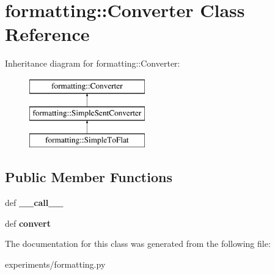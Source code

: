 \hypertarget{classformatting_1_1Converter}{
\section{formatting::Converter Class Reference}
\label{classformatting_1_1Converter}
}
Inheritance diagram for formatting::Converter:\begin{figure}[H]
\begin{center}
\leavevmode
\includegraphics[height=3cm]{classformatting_1_1Converter}
\end{center}
\end{figure}
\subsection*{Public Member Functions}
\begin{DoxyCompactItemize}
\item 
\hypertarget{classformatting_1_1Converter_aa837adfe8b8b6c686cbc7399db8baacb}{
def {\bfseries \_\-\_\-call\_\-\_\-}}
\label{classformatting_1_1Converter_aa837adfe8b8b6c686cbc7399db8baacb}

\item 
\hypertarget{classformatting_1_1Converter_a7dca32288a0528afe44baece7cf74e93}{
def {\bfseries convert}}
\label{classformatting_1_1Converter_a7dca32288a0528afe44baece7cf74e93}

\end{DoxyCompactItemize}


The documentation for this class was generated from the following file:\begin{DoxyCompactItemize}
\item 
experiments/formatting.py\end{DoxyCompactItemize}
